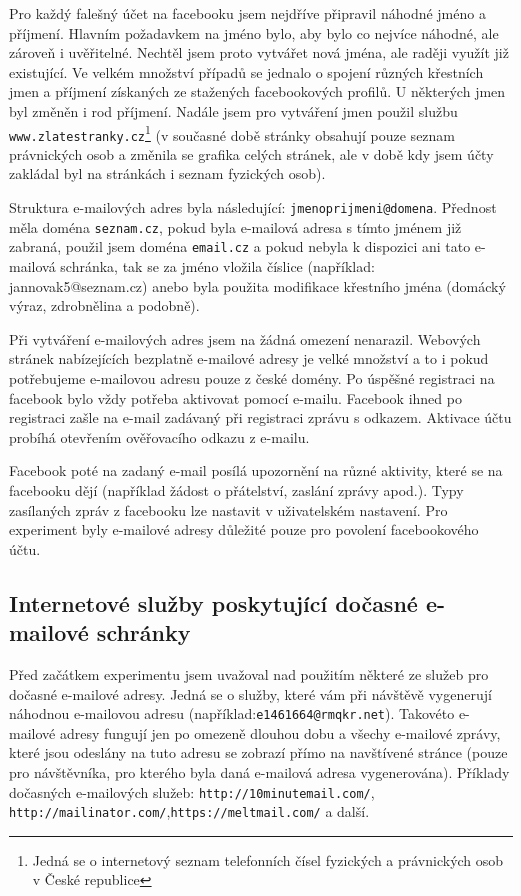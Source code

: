 \documentclass[thesis=M,czech]{FITthesis}[2013/05/10]
\begin{document}
Pro každý falešný účet na facebooku jsem nejdříve připravil náhodné jméno a příjmení. 
Hlavním požadavkem na jméno bylo, aby bylo co nejvíce náhodné, ale zároveň i uvěřitelné. 
Nechtěl jsem proto vytvářet nová jména, ale raději využít již existující.
Ve velkém množství případů se jednalo o spojení různých křestních jmen a příjmení získaných ze stažených facebookových profilů.
U některých jmen byl změněn i rod příjmení.
Nadále jsem pro vytváření jmen použil službu \verb|www.zlatestranky.cz|\footnote{Jedná se o internetový seznam telefonních čísel fyzických a právnických osob v České republice} (v současné době stránky obsahují pouze seznam právnických osob a změnila se grafika celých stránek, ale v době kdy jsem účty zakládal byl na stránkách i seznam fyzických osob).

Struktura e-mailových adres byla následující: \verb|jmenoprijmeni@domena|. Přednost měla doména \verb|seznam.cz|, pokud byla e-mailová adresa s tímto jménem již zabraná, použil jsem doména \verb|email.cz| a pokud nebyla k dispozici ani tato e-mailová schránka, tak se za jméno vložila číslice (například: jannovak5@seznam.cz) anebo byla použita modifikace křestního jména (domácký výraz, zdrobnělina a podobně).

Při vytváření e-mailových adres jsem na žádná omezení nenarazil. Webových stránek nabízejících bezplatně e-mailové adresy je velké množství a to i pokud potřebujeme e-mailovou adresu pouze z české domény. Po úspěšné registraci na facebook bylo vždy potřeba aktivovat pomocí e-mailu. Facebook ihned po registraci zašle na e-mail zadávaný při registraci zprávu s odkazem. Aktivace účtu probíhá otevřením ověřovacího odkazu z e-mailu.

Facebook poté na zadaný e-mail posílá upozornění na různé aktivity, které se na facebooku dějí (například žádost o přátelství, zaslání zprávy apod.). Typy zasílaných zpráv z facebooku lze nastavit v uživatelském nastavení. Pro experiment byly e-mailové adresy důležité pouze pro povolení facebookového účtu.

\subsection{Internetové služby poskytující dočasné e-mailové schránky}
Před začátkem experimentu jsem uvažoval nad použitím některé ze služeb pro dočasné e-mailové adresy. Jedná se o služby, které vám při návštěvě vygenerují náhodnou e-mailovou adresu (například:\newline \verb|e1461664@rmqkr.net|). Takovéto e-mailové adresy fungují jen po omezeně dlouhou dobu a všechy e-mailové zprávy, které jsou odeslány na tuto adresu se zobrazí přímo na navštívené stránce (pouze pro návštěvníka, pro kterého byla daná e-mailová adresa vygenerována). Příklady dočasných e-mailových služeb: \verb|http://10minutemail.com/|, \verb|http://mailinator.com/|,\newline \verb|https://meltmail.com/| a další.
\end{document}
